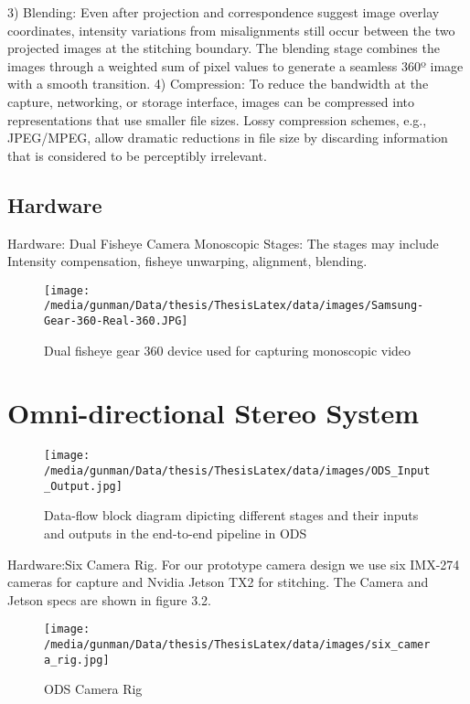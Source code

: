 3) Blending: Even after projection and correspondence suggest image overlay coordinates, intensity variations from misalignments still occur between the two projected images at the stitching boundary. The blending stage combines the images through a weighted sum of pixel values to generate a seamless 360º image with a smooth transition.	
4) Compression: To reduce the bandwidth at the capture, networking, or storage interface, images can be compressed into representations that use smaller file sizes. Lossy compression schemes, e.g., JPEG/MPEG, allow dramatic reductions in file size by discarding information that is considered to be perceptibly irrelevant.
\subsection{Hardware}
Hardware: Dual Fisheye Camera \newline
Monoscopic Stages:
The stages may include Intensity compensation, fisheye unwarping, alignment, blending. 
\begin{figure}[h]
	\begin{center}
		\texttt{[image: /media/gunman/Data/thesis/ThesisLatex/data/images/Samsung-Gear-360-Real-360.JPG]}
		\caption{Dual fisheye gear 360 device used for capturing monoscopic video}
		\label{ODS_Input_Output}
	\end{center}
	\vspace{-0.3in}
\end{figure} 





\section{Omni-directional Stereo System}
\begin{figure}[h]
	\begin{center}
		\texttt{[image: /media/gunman/Data/thesis/ThesisLatex/data/images/ODS\_Input\_Output.jpg]}
		\caption{Data-flow block diagram dipicting different stages and their inputs and outputs in the end-to-end pipeline in ODS}
		\label{ODS_Input_Output}
	\end{center}
	\vspace{-0.3in}
\end{figure} 

Hardware:Six Camera Rig.
For our prototype camera design we use six IMX-274 cameras for capture and Nvidia Jetson TX2 for stitching. The Camera and Jetson specs are shown in figure 3.2. \newline 
\begin{figure}[h]
	\begin{center}
		\texttt{[image: /media/gunman/Data/thesis/ThesisLatex/data/images/six\_camera\_rig.jpg]}
		\caption{ODS Camera Rig}
		\label{ODS_Input_Output}
	\end{center}
	\vspace{-0.3in}
\end{figure} 

